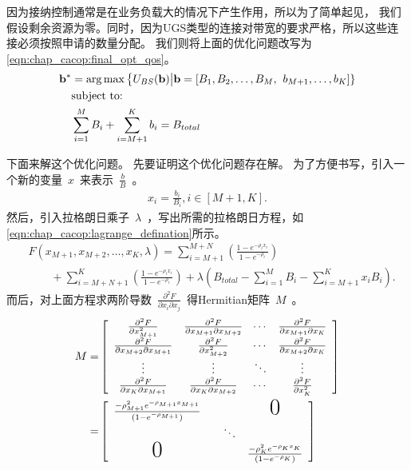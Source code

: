 因为接纳控制通常是在业务负载大的情况下产生作用，所以为了简单起见，
我们假设剩余资源为零。同时，因为UGS类型的连接对带宽的要求严格，所以这些连接必须按照申请的数量分配。
我们则将上面的优化问题改写为 \eqref{eqn:chap_cacop:final_opt_qos}。
\begin{align}{}
\label{eqn:chap_cacop:final_opt_qos}
\mathbf{b}^* &= \arg \max \left\{ U_{BS}(\mathbf{b}) \big| \mathbf{b} = [B_1, B_2, \dots,B_M,\right.
 \left. b_{M+1}, \ldots, b_K] \right\} \\
&\text{subject to:}\notag \\
&\sum_{i=1}^M B_i + \sum_{i=M+1}^{K}b_i= B_{total} \notag
\end{align}

下面来解这个优化问题。
先要证明这个优化问题存在解。
为了方便书写，引入一个新的变量~$x$~来表示~$\frac{b}{B}$~。
\begin{equation*}
\begin{split}
x_i = \frac{b_i}{B_i} , i \in [M+1, K].
\end{split}
\end{equation*}
然后，引入拉格朗日乘子~$\lambda$~，写出所需的拉格朗日方程，如
\eqref{eqn:chap_cacop:lagrange_defination}所示。
\begin{align}
&\displaystyle F(x_{M+1}, x_{M+2}, \dots, x_K, \lambda)= \sum^{M+N}_{i=M+1}
\left( \frac{1-e^{-\rho_i x_i}}{1-e^{-\rho_i}} \right) \nonumber \\
& \qquad \displaystyle +\sum_{i=M+N+1}^K\left( \frac{1-e^{-\rho_i x_i}}{1-e^{-\rho_i}} \right) 
 + \lambda
\left(B_{total} - \sum_{i=1}^M B_i -\sum^K_{i=M+1} x_i B_i \right).
\label{eqn:chap_cacop:lagrange_defination}
\end{align}
而后，对上面方程求两阶导数~$\frac{\partial ^2F}{\partial x_i \partial x_j}$~得Hermitian矩阵~${M}$~。
\begin{eqnarray*}
{M} = & 
\left[
\begin{array}{cccc}
\frac{\partial ^2F}{\partial x_{M+1} ^2} &\frac{\partial ^2F}{\partial x_{M+1} \partial x_{M+2}} & \dotsi & \frac{\partial ^2F}{\partial x_{M+1} \partial x_K} \\
\frac{\partial ^2F}{\partial x_{M+2} \partial x_{M+1}}& \frac{\partial ^2F}{\partial x_{M+2} ^2}& \dotsi & \frac{\partial ^2F}{\partial x_{M+2} \partial x_K}\\
\vdots & \vdots & \ddots & \vdots \\

\frac{\partial ^2F}{\partial x_{K} \partial x_{M+1} } &\frac{\partial ^2F}{\partial x_{K} \partial x_{M+2}} & \dotsi&\frac{\partial ^2F}{\partial x_K ^2}\\
\end{array}
\right] \\
=&
\left[
\begin{array}{cccc}
\frac{-\rho_{M+1}^2 e^{-\rho_{M+1} x_{M+1}}}{(1-e^{-\rho_{M+1}})} & & & \text{{\huge{0}}}\\
&&\ddots\\
\text{{\huge{0}}} &&& \frac{-\rho_{K}^2 e^{-\rho_{K} x_{K}}}{(1-e^{-\rho_{K}})}\\
\end{array}
\right] 
\end{eqnarray*}
